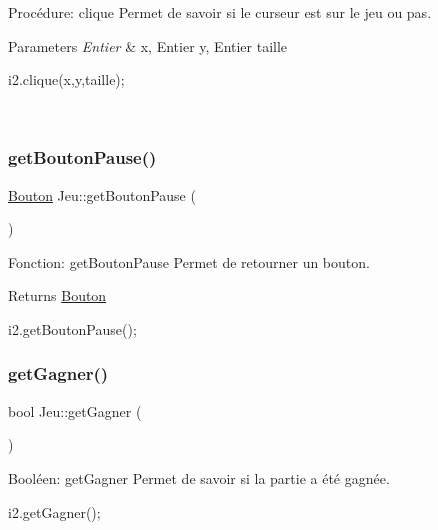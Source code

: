 Procédure\+: clique Permet de savoir si le curseur est sur le jeu ou pas. 


\begin{DoxyParams}{Parameters}
{\em Entier} & x, Entier y, Entier taille 
\begin{DoxyCode}
i2.clique(x,y,taille);
\end{DoxyCode}
 \\
\hline
\end{DoxyParams}
\mbox{\label{classJeu_a550a74e12dedc1170162141fa9356fb6}} 
\subsubsection{\texorpdfstring{get\+Bouton\+Pause()}{getBoutonPause()}}
{\footnotesize\ttfamily \hyperlink{classBouton}{Bouton} Jeu\+::get\+Bouton\+Pause (\begin{DoxyParamCaption}{ }\end{DoxyParamCaption})}



Fonction\+: get\+Bouton\+Pause Permet de retourner un bouton. 

\begin{DoxyReturn}{Returns}
\hyperlink{classBouton}{Bouton} 
\begin{DoxyCode}
i2.getBoutonPause();
\end{DoxyCode}
 
\end{DoxyReturn}
\mbox{\label{classJeu_a1dee637787fc6976f2b504631780bf38}} 
\subsubsection{\texorpdfstring{get\+Gagner()}{getGagner()}}
{\footnotesize\ttfamily bool Jeu\+::get\+Gagner (\begin{DoxyParamCaption}{ }\end{DoxyParamCaption})}



Booléen\+: get\+Gagner Permet de savoir si la partie a été gagnée. 


\begin{DoxyCode}
i2.getGagner();
\end{DoxyCode}
 \mbox{\label{classJeu_a01d73851016ee4edb6742231d4084ad7}} 
